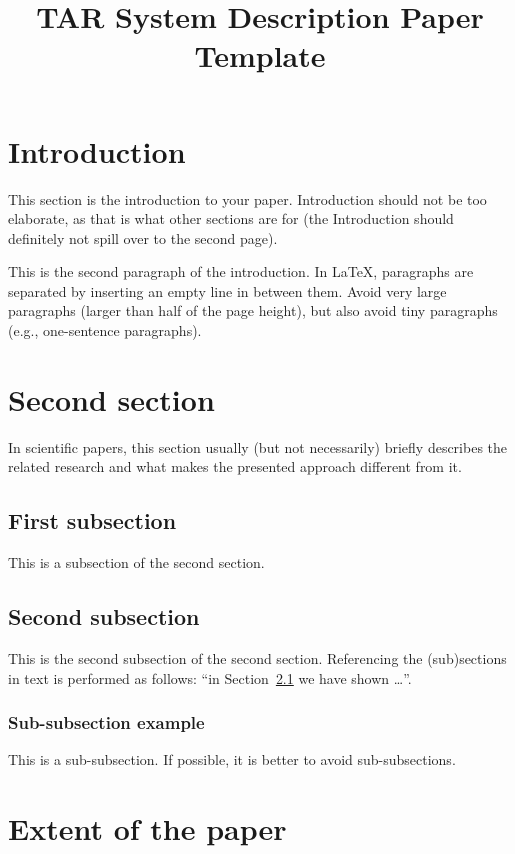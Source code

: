 \documentclass[10pt, a4paper]{article}
\title{TAR System Description Paper Template}
\begin{document}
\maketitleabstract

\section{Introduction}

This section is the introduction to your paper. Introduction should not be too elaborate, as that is what other sections are for (the Introduction should definitely not spill over to the second page). 

This is the second paragraph of the introduction. In \LaTeX , paragraphs are separated by inserting an empty line in between them.  Avoid very large paragraphs (larger than half of the page height), but also avoid tiny paragraphs (e.g., one-sentence paragraphs).

\section{Second section}

In scientific papers, this section usually (but not necessarily) briefly describes the related research and what makes the presented approach different from it.

\subsection{First subsection}
\label{sec:first}

This is a subsection of the second section.

\subsection{Second subsection}

This is the second subsection of the second section. Referencing the (sub)sections in text is performed as follows: ``in Section~\ref{sec:first} we have shown \dots''.

\subsubsection{Sub-subsection example} 

This is a sub-subsection. If possible, it is better to avoid sub-subsections. 

\section{Extent of the paper}
\end{document}
